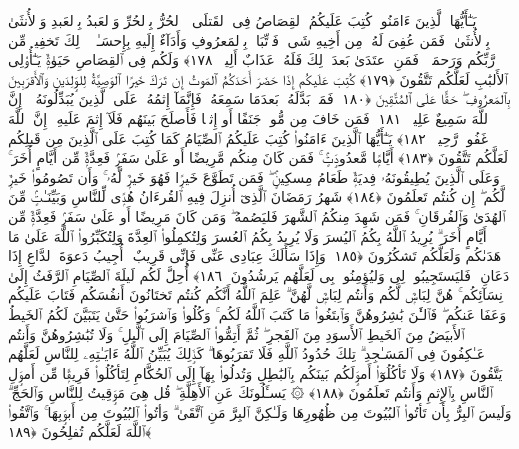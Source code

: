  يَـٰٓأَيُّهَا ٱلَّذِينَ ءَامَنُوا۟ كُتِبَ عَلَيكُمُ ٱلقِصَاصُ فِى ٱلقَتلَى ۖ ٱلحُرُّ بِٱلحُرِّ وَٱلعَبدُ بِٱلعَبدِ وَٱلأُنثَىٰ بِٱلأُنثَىٰ ۚ فَمَن عُفِىَ لَهُۥ مِن أَخِيهِ شَىءٌۭ فَٱتِّبَاعٌۢ بِٱلمَعرُوفِ وَأَدَآءٌ إِلَيهِ بِإِحسَـٰنٍۢ ۗ ذَٟلِكَ تَخفِيفٌۭ مِّن رَّبِّكُم وَرَحمَةٌۭ ۗ فَمَنِ ٱعتَدَىٰ بَعدَ ذَٟلِكَ فَلَهُۥ عَذَابٌ أَلِيمٌۭ ﴿١٧٨﴾
 وَلَكُم فِى ٱلقِصَاصِ حَيَوٰةٌۭ يَـٰٓأُو۟لِى ٱلأَلبَٰبِ لَعَلَّكُم تَتَّقُونَ ﴿١٧٩﴾
 كُتِبَ عَلَيكُم إِذَا حَضَرَ أَحَدَكُمُ ٱلمَوتُ إِن تَرَكَ خَيرًا ٱلوَصِيَّةُ لِلوَٟلِدَينِ وَٱلأَقرَبِينَ بِٱلمَعرُوفِ ۖ حَقًّا عَلَى ٱلمُتَّقِينَ ﴿١٨٠﴾
 فَمَنۢ بَدَّلَهُۥ بَعدَمَا سَمِعَهُۥ فَإِنَّمَآ إِثمُهُۥ عَلَى ٱلَّذِينَ يُبَدِّلُونَهُۥٓ ۚ إِنَّ ٱللَّهَ سَمِيعٌ عَلِيمٌۭ ﴿١٨١﴾
 فَمَن خَافَ مِن مُّوصٍۢ جَنَفًا أَو إِثمًۭا فَأَصلَحَ بَينَهُم فَلَآ إِثمَ عَلَيهِ ۚ إِنَّ ٱللَّهَ غَفُورٌۭ رَّحِيمٌۭ ﴿١٨٢﴾
 يَـٰٓأَيُّهَا ٱلَّذِينَ ءَامَنُوا۟ كُتِبَ عَلَيكُمُ ٱلصِّيَامُ كَمَا كُتِبَ عَلَى ٱلَّذِينَ مِن قَبلِكُم لَعَلَّكُم تَتَّقُونَ ﴿١٨٣﴾
 أَيَّامًۭا مَّعدُودَٟتٍۢ ۚ فَمَن كَانَ مِنكُم مَّرِيضًا أَو عَلَىٰ سَفَرٍۢ فَعِدَّةٌۭ مِّن أَيَّامٍ أُخَرَ ۚ وَعَلَى ٱلَّذِينَ يُطِيقُونَهُۥ فِديَةٌۭ طَعَامُ مِسكِينٍۢ ۖ فَمَن تَطَوَّعَ خَيرًۭا فَهُوَ خَيرٌۭ لَّهُۥ ۚ وَأَن تَصُومُوا۟ خَيرٌۭ لَّكُم ۖ إِن كُنتُم تَعلَمُونَ ﴿١٨٤﴾
 شَهرُ رَمَضَانَ ٱلَّذِىٓ أُنزِلَ فِيهِ ٱلقُرءَانُ هُدًۭى لِّلنَّاسِ وَبَيِّنَـٰتٍۢ مِّنَ ٱلهُدَىٰ وَٱلفُرقَانِ ۚ فَمَن شَهِدَ مِنكُمُ ٱلشَّهرَ فَليَصُمهُ ۖ وَمَن كَانَ مَرِيضًا أَو عَلَىٰ سَفَرٍۢ فَعِدَّةٌۭ مِّن أَيَّامٍ أُخَرَ ۗ يُرِيدُ ٱللَّهُ بِكُمُ ٱليُسرَ وَلَا يُرِيدُ بِكُمُ ٱلعُسرَ وَلِتُكمِلُوا۟ ٱلعِدَّةَ وَلِتُكَبِّرُوا۟ ٱللَّهَ عَلَىٰ مَا هَدَىٰكُم وَلَعَلَّكُم تَشكُرُونَ ﴿١٨٥﴾
 وَإِذَا سَأَلَكَ عِبَادِى عَنِّى فَإِنِّى قَرِيبٌ ۖ أُجِيبُ دَعوَةَ ٱلدَّاعِ إِذَا دَعَانِ ۖ فَليَستَجِيبُوا۟ لِى وَليُؤمِنُوا۟ بِى لَعَلَّهُم يَرشُدُونَ ﴿١٨٦﴾
 أُحِلَّ لَكُم لَيلَةَ ٱلصِّيَامِ ٱلرَّفَثُ إِلَىٰ نِسَآئِكُم ۚ هُنَّ لِبَاسٌۭ لَّكُم وَأَنتُم لِبَاسٌۭ لَّهُنَّ ۗ عَلِمَ ٱللَّهُ أَنَّكُم كُنتُم تَختَانُونَ أَنفُسَكُم فَتَابَ عَلَيكُم وَعَفَا عَنكُم ۖ فَٱلـَٰٔنَ بَٰشِرُوهُنَّ وَٱبتَغُوا۟ مَا كَتَبَ ٱللَّهُ لَكُم ۚ وَكُلُوا۟ وَٱشرَبُوا۟ حَتَّىٰ يَتَبَيَّنَ لَكُمُ ٱلخَيطُ ٱلأَبيَضُ مِنَ ٱلخَيطِ ٱلأَسوَدِ مِنَ ٱلفَجرِ ۖ ثُمَّ أَتِمُّوا۟ ٱلصِّيَامَ إِلَى ٱلَّيلِ ۚ وَلَا تُبَٰشِرُوهُنَّ وَأَنتُم عَـٰكِفُونَ فِى ٱلمَسَـٰجِدِ ۗ تِلكَ حُدُودُ ٱللَّهِ فَلَا تَقرَبُوهَا ۗ كَذَٟلِكَ يُبَيِّنُ ٱللَّهُ ءَايَـٰتِهِۦ لِلنَّاسِ لَعَلَّهُم يَتَّقُونَ ﴿١٨٧﴾
 وَلَا تَأكُلُوٓا۟ أَموَٟلَكُم بَينَكُم بِٱلبَٰطِلِ وَتُدلُوا۟ بِهَآ إِلَى ٱلحُكَّامِ لِتَأكُلُوا۟ فَرِيقًۭا مِّن أَموَٟلِ ٱلنَّاسِ بِٱلإِثمِ وَأَنتُم تَعلَمُونَ ﴿١٨٨﴾
 ۞ يَسـَٔلُونَكَ عَنِ ٱلأَهِلَّةِ ۖ قُل هِىَ مَوَٟقِيتُ لِلنَّاسِ وَٱلحَجِّ ۗ وَلَيسَ ٱلبِرُّ بِأَن تَأتُوا۟ ٱلبُيُوتَ مِن ظُهُورِهَا وَلَـٰكِنَّ ٱلبِرَّ مَنِ ٱتَّقَىٰ ۗ وَأتُوا۟ ٱلبُيُوتَ مِن أَبوَٟبِهَا ۚ وَٱتَّقُوا۟ ٱللَّهَ لَعَلَّكُم تُفلِحُونَ ﴿١٨٩﴾
